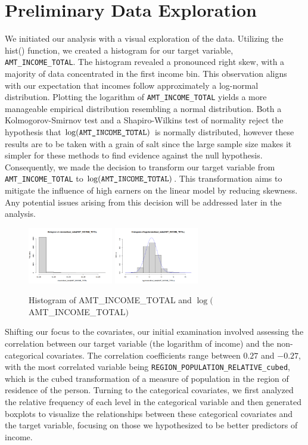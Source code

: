 \documentclass[12pt]{article}
\begin{document}
\section{Preliminary Data Exploration}
We initiated our analysis with a visual exploration of the data. Utilizing the hist() function, we created a histogram for our target variable, \verb|AMT_INCOME_TOTAL|. The histogram revealed a pronounced right skew, with a majority of data concentrated in the first income bin. This observation aligns with our expectation that incomes follow approximately a log-normal distribution. Plotting the logarithm of \verb|AMT_INCOME_TOTAL| yields a more manageable empirical distribution resembling a normal distribution. Both a Kolmogorov-Smirnov test and a Shapiro-Wilkins test of normality reject the hypothesis that $\log(\verb|AMT_INCOME_TOTAL|)$ is normally distributed, however these results are to be taken with a grain of salt since the large sample size makes it simpler for these methods to find evidence against the null hypothesis. Consequently, we made the decision to transform our target variable from \verb|AMT_INCOME_TOTAL| to $\log(\verb|AMT_INCOME_TOTAL|)$. This transformation aims to mitigate the influence of high earners on the linear model by reducing skewness. Any potential issues arising from this decision will be addressed later in the analysis.
\begin{figure}[h]
  \begin{center}
  \includegraphics[width=0.33\textwidth]{img/a1b39273-b5d2-451d-9d9d-a30b5c0b4dd3.png}
  \includegraphics[width=0.33\textwidth]{img/9e794c04-13e9-48c6-b995-857e31e77b52.png}
\end{center}
\caption{Histogram of AMT\_INCOME\_TOTAL and $\log($AMT\_INCOME\_TOTAL$)$}
\end{figure}
Shifting our focus to the covariates, our initial examination involved assessing the correlation between our target variable (the logarithm of income) and the non-categorical covariates. The correlation coefficients range between $0.27$ and $-0.27$, with the most correlated variable being \verb|REGION_POPULATION_RELATIVE_cubed|, which is the cubed transformation of a measure of population in the region of residence of the person. Turning to the categorical covariates, we first analyzed the relative frequency of each level in the categorical variable and then generated boxplots to visualize the relationships between these categorical covariates and the target variable, focusing on those we hypothesized to be better predictors of income.
\end{document}
